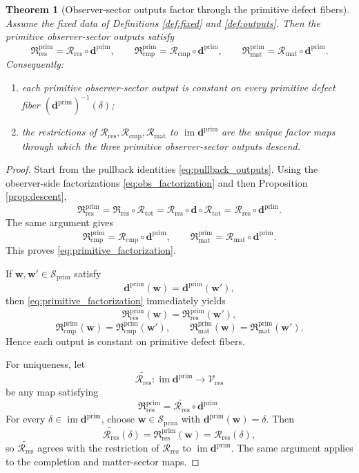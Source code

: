 \documentclass[11pt]{article}
\newcommand{\ReductionTriple}{\mathcal R_{\mathrm{tot}}}
\newcommand{\PrimShell}{\mathcal S_{\mathrm{prim}}}
\newcommand{\DefectTuple}{\mathbf d}
\newcommand{\PrimDefectTuple}{\mathbf d^{\mathrm{prim}}}
\newcommand{\ObsResidualSector}{\mathfrak R_{\mathrm{res}}}
\newcommand{\PrimResidualSector}{\mathfrak R_{\mathrm{res}}^{\mathrm{prim}}}
\newcommand{\PrimCompletionSector}{\mathfrak R_{\mathrm{cmp}}^{\mathrm{prim}}}
\newcommand{\PrimMatterSector}{\mathfrak R_{\mathrm{mat}}^{\mathrm{prim}}}
\newcommand{\ResidualRead}{\mathscr R_{\mathrm{res}}}
\newcommand{\CompletionRead}{\mathscr R_{\mathrm{cmp}}}
\newcommand{\MatterRead}{\mathscr R_{\mathrm{mat}}}
\newcommand{\ResidualTarget}{\mathcal V_{\mathrm{res}}}
\newtheorem{theorem}{Theorem}
\begin{document}
\begin{theorem}[Observer-sector outputs factor through the primitive defect fibers]
\label{thm:factor}
Assume the fixed data of Definitions \ref{def:fixed} and \ref{def:outputs}. Then the primitive observer-sector outputs satisfy
\begin{equation}
\PrimResidualSector
=
\ResidualRead\circ\PrimDefectTuple,
\qquad
\PrimCompletionSector
=
\CompletionRead\circ\PrimDefectTuple,
\qquad
\PrimMatterSector
=
\MatterRead\circ\PrimDefectTuple.
\label{eq:primitive_factorization}
\end{equation}
Consequently:
\begin{enumerate}
    \item each primitive observer-sector output is constant on every primitive defect fiber \((\PrimDefectTuple)^{-1}(\delta)\);
    \item the restrictions of \(\ResidualRead,\CompletionRead,\MatterRead\) to \(\operatorname{im}\PrimDefectTuple\) are the unique factor maps through which the three primitive observer-sector outputs descend.
\end{enumerate}
\end{theorem}

\begin{proof}
Start from the pullback identities \eqref{eq:pullback_outputs}. Using the observer-side factorizations \eqref{eq:obs_factorization} and then Proposition \ref{prop:descent},
\[
\PrimResidualSector
=
\ObsResidualSector\circ\ReductionTriple
=
\ResidualRead\circ\DefectTuple\circ\ReductionTriple
=
\ResidualRead\circ\PrimDefectTuple.
\]
The same argument gives
\[
\PrimCompletionSector
=
\CompletionRead\circ\PrimDefectTuple,
\qquad
\PrimMatterSector
=
\MatterRead\circ\PrimDefectTuple.
\]
This proves \eqref{eq:primitive_factorization}.

If \(\mathbf w,\mathbf w'\in\PrimShell\) satisfy
\[
\PrimDefectTuple(\mathbf w)=\PrimDefectTuple(\mathbf w'),
\]
then \eqref{eq:primitive_factorization} immediately yields
\[
\PrimResidualSector(\mathbf w)=\PrimResidualSector(\mathbf w'),
\]
\[
\PrimCompletionSector(\mathbf w)=\PrimCompletionSector(\mathbf w'),
\qquad
\PrimMatterSector(\mathbf w)=\PrimMatterSector(\mathbf w').
\]
Hence each output is constant on primitive defect fibers.

For uniqueness, let
\[
\widetilde{\ResidualRead}:\operatorname{im}\PrimDefectTuple\to\ResidualTarget
\]
be any map satisfying
\[
\PrimResidualSector=\widetilde{\ResidualRead}\circ\PrimDefectTuple.
\]
For every \(\delta\in\operatorname{im}\PrimDefectTuple\), choose \(\mathbf w\in\PrimShell\) with \(\PrimDefectTuple(\mathbf w)=\delta\). Then
\[
\widetilde{\ResidualRead}(\delta)
=
\PrimResidualSector(\mathbf w)
=
\ResidualRead(\delta),
\]
so \(\widetilde{\ResidualRead}\) agrees with the restriction of \(\ResidualRead\) to \(\operatorname{im}\PrimDefectTuple\). The same argument applies to the completion and matter-sector maps.
\end{proof}
\end{document}
